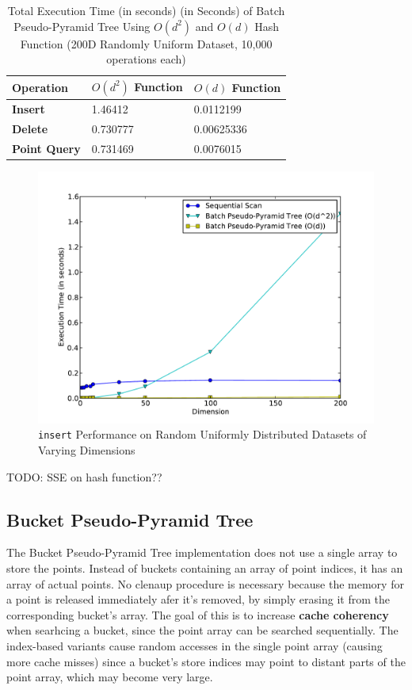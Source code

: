 \begin{table}
	\centering
	\begin{tabular}{|l|l|l|}
		\hline
		\textbf{Operation} & \textbf{$O(d^2)$ Function} & \textbf{$O(d)$ Function} \\
		\hline
		\textbf{Insert} & 1.46412 & 0.0112199 \\
		\textbf{Delete} & 0.730777 & 0.00625336 \\
		\textbf{Point Query} & 0.731469 & 0.0076015 \\
		\hline
	\end{tabular}
	\caption{Total Execution Time (in seconds) (in Seconds) of Batch Pseudo-Pyramid Tree Using $O(d^2)$ and $O(d)$ Hash Function (200D Randomly Uniform Dataset, 10,000 operations each)}
	\label{tab:new-pseudo-pyramid-hash}
\end{table}

\begin{figure}
	\centering
	\includegraphics[scale=0.5]{figures/performance_analysis/iteration_2/new_pseudo-pyramid_hash_performance.pdf}
	\caption{\texttt{insert} Performance on Random Uniformly Distributed Datasets of Varying Dimensions}
	\label{fig:new-pseudo-pyramid-hash}
\end{figure}

TODO: SSE on hash function??

\subsection{Bucket Pseudo-Pyramid Tree}

The Bucket Pseudo-Pyramid Tree implementation does not use a single array to store the points. Instead of buckets containing an array of point indices, it has an array of actual points. No clenaup procedure is necessary because the memory for a point is released immediately afer it's removed, by simply erasing it from the corresponding bucket's array. The goal of this is to increase \textbf{cache coherency} when searhcing a bucket, since the point array can be searched sequentially. The index-based variants cause random accesses in the single point array (causing more cache misses) since a bucket's store indices may point to distant parts of the point array, which may become very large.

